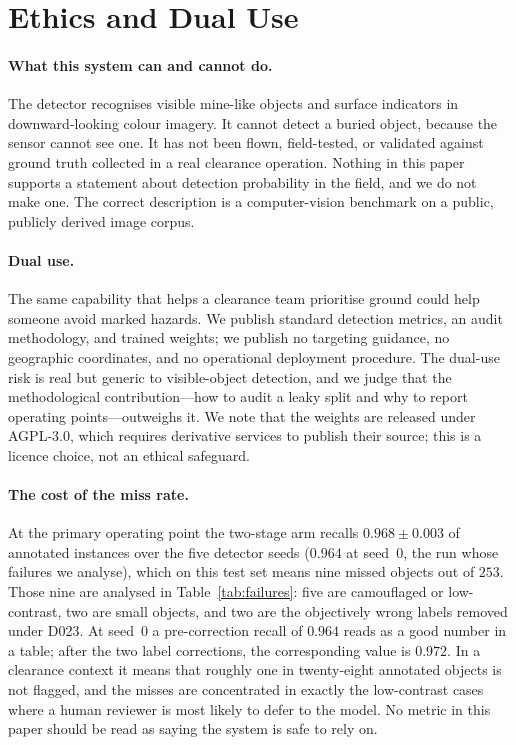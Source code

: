 \section{Ethics and Dual Use}
\label{sec:ethics}

\paragraph{What this system can and cannot do.} The detector recognises visible
mine-like objects and surface indicators in downward-looking colour imagery. It
cannot detect a buried object, because the sensor cannot see one. It has not been
flown, field-tested, or validated against ground truth collected in a real
clearance operation. Nothing in this paper supports a statement about detection
probability in the field, and we do not make one. The correct description is a
computer-vision benchmark on a public, publicly derived image corpus.

\paragraph{Dual use.} The same capability that helps a clearance team prioritise
ground could help someone avoid marked hazards. We publish standard detection
metrics, an audit methodology, and trained weights; we publish no targeting
guidance, no geographic coordinates, and no operational deployment procedure.
The dual-use risk is real but generic to visible-object detection, and we judge
that the methodological contribution---how to audit a leaky split and why to
report operating points---outweighs it. We note that the weights are released
under AGPL-3.0, which requires derivative services to publish their source; this
is a licence choice, not an ethical safeguard.

\paragraph{The cost of the miss rate.} At the primary operating point the
two-stage arm recalls $0.968 \pm 0.003$ of annotated instances over the five
detector seeds ($0.964$ at seed~$0$, the run whose failures we analyse), which on
this test set means nine missed objects out of $253$. Those nine are analysed in
Table~\ref{tab:failures}: five are camouflaged or low-contrast, two are small
objects, and two are the objectively wrong labels removed under D023. At seed~$0$ a
pre-correction recall of $0.964$ reads as a good number in a table; after the
two label corrections, the corresponding value is $0.972$. In a clearance context it
means that roughly one in twenty-eight annotated objects is not flagged, and the
misses are concentrated in exactly the low-contrast cases where a human reviewer
is most likely to defer to the model. No metric in this paper should be read as
saying the system is safe to rely on.

